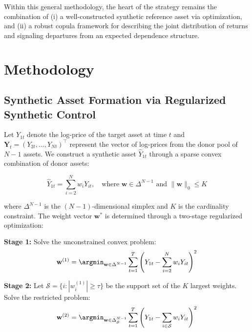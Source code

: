 Within this general methodology, the heart of the strategy remains the combination of (i) a well-constructed synthetic reference asset via optimization, and (ii) a robust copula framework for describing the joint distribution of returns and signaling departures from an expected dependence structure.





\section{Methodology}
\subsection{Synthetic Asset Formation via Regularized Synthetic Control}
Let $Y_{1t}$ denote the log-price of the target asset at time $t$ and $\mathbf{Y}_{t} = (Y_{2t},...,Y_{Nt})^\top$ represent the vector of log-prices from the donor pool of $N-1$ assets. We construct a synthetic asset $\hat{Y}_{1t}$ through a sparse convex combination of donor assets:

\begin{equation}
\hat{Y}_{1t} = \sum_{i=2}^N w_i Y_{it},\quad \text{where } \mathbf{w} \in \Delta^{N-1} \text{ and } \|\mathbf{w}\|_0 \leq K
\end{equation}

where $\Delta^{N-1}$ is the $(N-1)$-dimensional simplex and $K$ is the cardinality constraint. The weight vector $\mathbf{w}^*$ is determined through a two-stage regularized optimization:

\textbf{Stage 1:} Solve the unconstrained convex problem:
\begin{equation}
\mathbf{w}^{(1)} = \argmin_{\mathbf{w} \in \Delta^{N-1}} \sum_{t=1}^T \left(Y_{1t} - \sum_{i=2}^N w_i Y_{it}\right)^2
\end{equation}

\textbf{Stage 2:} Let $\mathcal{S} = \{i : |w_i^{(1)}| \geq \tau\}$ be the support set of the $K$ largest weights. Solve the restricted problem:
\begin{equation}
\mathbf{w}^{(2)} = \argmin_{\mathbf{w} \in \Delta^{N-1}_{\mathcal{S}}} \sum_{t=1}^T \left(Y_{1t} - \sum_{i \in \mathcal{S}} w_i Y_{it}\right)^2
\end{equation}

